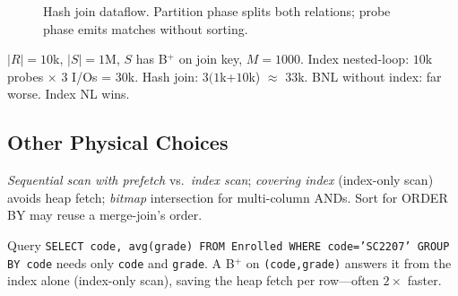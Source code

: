 \begin{figure}[h]
\centering
{}
\caption{Hash join dataflow. Partition phase splits both relations; probe phase emits matches without sorting.}
\label{fig:hash-join}
\end{figure}

\begin{example}
$|R|=10$k, $|S|=1$M, $S$ has B$^+$ on join key, $M=1000$. Index nested-loop: $10$k probes $\times$ $3$ I/Os = 30k. Hash join: $3(1$k+$10$k) $\approx$ 33k. BNL without index: far worse. Index NL wins.
\end{example}

\subsection{Other Physical Choices}

\emph{Sequential scan with prefetch} vs.\ \emph{index scan}; \emph{covering index} (index-only scan) avoids heap fetch; \emph{bitmap} intersection for multi-column ANDs. Sort for ORDER BY may reuse a merge-join's order.

\begin{example}
Query \texttt{SELECT code, avg(grade) FROM Enrolled WHERE code='SC2207' GROUP BY code} needs only \texttt{code} and \texttt{grade}. A B$^+$ on \texttt{(code,grade)} answers it from the index alone (index-only scan), saving the heap fetch per row---often $2\times$ faster.
\end{example}

